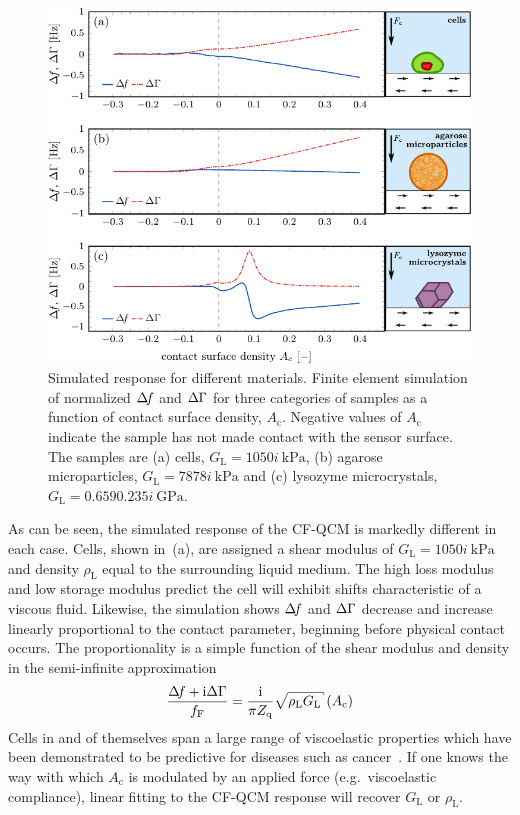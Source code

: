 \begin{figure}[ht]
 \centering
\includegraphics{qcm/figures/multisweep.pdf}
\caption{Simulated response for different materials.  Finite element simulation of normalized $\Delta\!f$ and $\Delta\Gamma$ for three
 categories of samples as a function of contact surface density,
 $A_\mathrm{c}$.
	Negative values of $A_\mathrm{c}$ indicate the sample has not made contact with the sensor
 surface.
 The samples are (a) cells, $G_\mathrm{L}=\SI{10+50i}{\kilo\pascal}$, (b)
 agarose microparticles, $G_\mathrm{L}=\SI{78+78i}{\kilo\pascal}$ and (c) lysozyme
 microcrystals, $G_\mathrm{L}=\SI{0.659+0.235i}{\giga\pascal}$.  }
\label{fig:multisweep}
\end{figure}

As can be seen, the simulated response of the CF-QCM is markedly different
in each case. Cells, shown in \,(a), are assigned a
shear modulus of
$G_\mathrm{L}=\SI{10+50i}{\kilo\pascal}$~\cite{li2008thickness}~\cite{mahaffy2004quantitative} and density
$\rho_\mathrm{L}$ equal to the surrounding liquid medium.  The high loss
modulus and low storage modulus predict the cell will exhibit shifts
characteristic of a viscous fluid.  Likewise, the simulation shows $\Delta\!f$
and $\Delta\Gamma$ decrease and increase linearly proportional to the contact
parameter, beginning before physical contact occurs.  The proportionality
is a simple function of the shear modulus and density in the
semi-infinite approximation~\cite{flanigan2000contact}~\cite{kanazawa1985frequency}
\begin{equation}
 \frac{\df+\mi\dg}{f_\mathrm{F}}=\frac{\mi}{\pi Z_\mathrm{q}}\sqrt{\rho_\mathrm{L} G_\mathrm{L}}
 \left(A_\mathrm{c}\right)
\end{equation}
 Cells in and of
themselves span a large range of viscoelastic properties which have been
demonstrated to be predictive for diseases such as
cancer~\cite{rebelo2013comparison}.  If one knows the way with which
$A_\mathrm{c}$ is modulated by an applied force (e.g.\ viscoelastic
compliance), linear fitting to
the CF-QCM response will recover $G_\mathrm{L}$ or $\rho_\mathrm{L}$.

